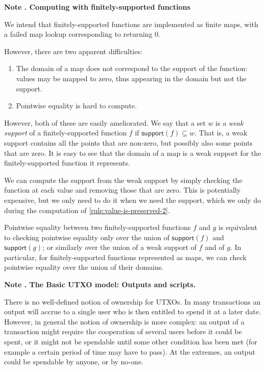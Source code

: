 \documentclass[a4paper]{article}
\newcounter{note}
\newcommand{\note}[1]{
  \bigskip
  \refstepcounter{note}
  \noindent\textbf{Note \thenote. #1}
}
\newcommand{\msf}[1]{\ensuremath{\mathsf{#1}}}
\newcommand{\support}{\msf{support}}
\begin{document}
\note{Computing with finitely-supported functions}
\label{note:finitely-supported-functions}

We intend that finitely-supported functions are implemented as finite
maps, with a failed map lookup corresponding to returning 0.

However, there are two apparent difficulties:
\begin{enumerate}
  \item The domain of a map does not correspond to the support of the function:
    values may be mapped to zero, thus appearing in the domain but not the support.
  \item Pointwise equality is hard to compute.
\end{enumerate}

However, both of these are easily ameliorated. We say that a set $w$ is a \textit{weak support}
of a finitely-supported function $f$ if $\support(f) \subseteq w$. That is, a
weak support contains all the points that are non-zero, but possibly also some
points that are zero. It is easy to see that the domain of a map is a weak
support for the finitely-supported function it represents.

We can compute the support from the weak support by simply checking the function
at each value and removing those that are zero. This is potentially expensive,
but we only need to do it when we need the support, which we only do during the
computation of \cref{rule:value-is-preserved-2}.

Pointwise equality between two finitely-supported functions $f$ and $g$ is
equivalent to checking pointwise equality only over the union of $\support(f)$
and $\support(g)$; or similarly over the union of a weak support of $f$ and of
$g$. In particular, for finitely-supported functions represented as maps, we can
check pointwise equality over the union of their domains.

\note{The Basic UTXO model: Outputs and scripts.}
\label{note:basic-utxo}
There is no well-defined notion of ownership for UTXOs.  In many
transactions an output will accrue to a single user who is then
entitled to spend it at a later date.  However, in general the notion
of ownership is more complex: an output of a transaction might require
the cooperation of several users before it could be spent, or it might
not be spendable until some other condition has been met (for example
a certain period of time may have to pass).  At the extremes, an
output could be spendable by anyone, or by no-one.
\end{document}
